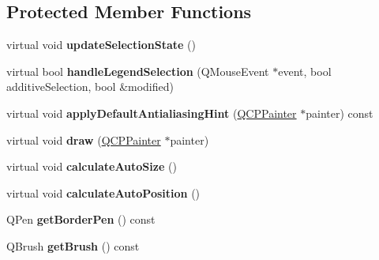 \subsection*{Protected Member Functions}
\begin{DoxyCompactItemize}
\item 
\hypertarget{classQCPLegend_ac214f7503cf46225f08f91003f554bdd}{virtual void {\bfseries update\-Selection\-State} ()}\label{classQCPLegend_ac214f7503cf46225f08f91003f554bdd}

\item 
\hypertarget{classQCPLegend_a44cdc6af6cd6e62a2bd827c3236c7261}{virtual bool {\bfseries handle\-Legend\-Selection} (Q\-Mouse\-Event $\ast$event, bool additive\-Selection, bool \&modified)}\label{classQCPLegend_a44cdc6af6cd6e62a2bd827c3236c7261}

\item 
\hypertarget{classQCPLegend_a26307f532c3458b379663b7d517a5f47}{virtual void {\bfseries apply\-Default\-Antialiasing\-Hint} (\hyperlink{classQCPPainter}{Q\-C\-P\-Painter} $\ast$painter) const }\label{classQCPLegend_a26307f532c3458b379663b7d517a5f47}

\item 
\hypertarget{classQCPLegend_a4462151bf875ca85fa3815457c683fdc}{virtual void {\bfseries draw} (\hyperlink{classQCPPainter}{Q\-C\-P\-Painter} $\ast$painter)}\label{classQCPLegend_a4462151bf875ca85fa3815457c683fdc}

\item 
\hypertarget{classQCPLegend_aefb91ff99ea360dede1a96b91e14fcd2}{virtual void {\bfseries calculate\-Auto\-Size} ()}\label{classQCPLegend_aefb91ff99ea360dede1a96b91e14fcd2}

\item 
\hypertarget{classQCPLegend_a1e81744daf2b51ed7025e7357d6f88a1}{virtual void {\bfseries calculate\-Auto\-Position} ()}\label{classQCPLegend_a1e81744daf2b51ed7025e7357d6f88a1}

\item 
\hypertarget{classQCPLegend_a60172c9d2212584f38f5d0c1e50970c7}{Q\-Pen {\bfseries get\-Border\-Pen} () const }\label{classQCPLegend_a60172c9d2212584f38f5d0c1e50970c7}

\item 
\hypertarget{classQCPLegend_a236fe4cd617c9f88620fd9de74417f20}{Q\-Brush {\bfseries get\-Brush} () const }\label{classQCPLegend_a236fe4cd617c9f88620fd9de74417f20}

\end{DoxyCompactItemize}
